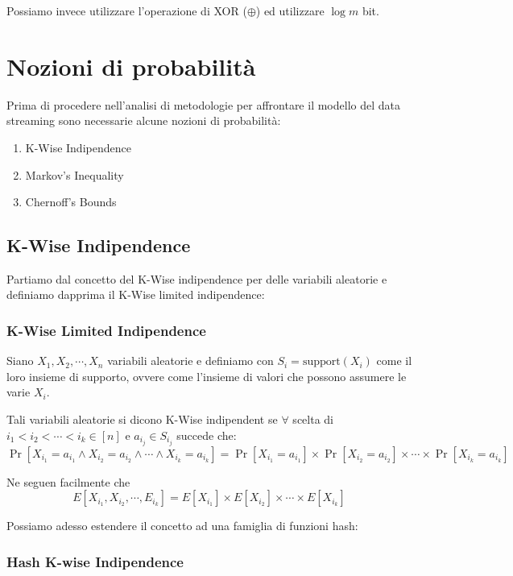 \documentclass[a4paper,11pt]{book}
\begin{document}
Possiamo invece utilizzare l'operazione di \textsf{XOR} ($\oplus$) ed utilizzare $\log m$ bit.

\section{Nozioni di probabilit\`a}

Prima di procedere nell'analisi di metodologie per affrontare il modello del data streaming sono necessarie alcune nozioni di probabilit\`a:
\begin{enumerate}
\item K-Wise Indipendence
\item Markov's Inequality
\item Chernoff's Bounds
\end{enumerate}

\subsection{K-Wise Indipendence}

Partiamo dal concetto del K-Wise indipendence per delle variabili aleatorie e definiamo dapprima il K-Wise limited indipendence:

\subsubsection{K-Wise Limited Indipendence}

Siano $X_1, X_2, \cdots, X_n$ variabili aleatorie e definiamo con $S_i = \mbox{support}(X_i)$ come il loro insieme di supporto, ovvere come l'insieme di valori che possono assumere le varie $X_i$.

Tali variabili aleatorie si dicono K-Wise indipendent se $\forall$ scelta di $i_1 < i_2 < \cdots < i_k \in [n]$ e $a_{i_j} \in S_{i_j}$ succede che:
$$\Pr[X_{i_1} = a_{i_1} \wedge X_{i_2} = a_{i_2} \wedge \cdots \wedge X_{i_k} = a_{i_k}] = \Pr[X_{i_1} = a_{i_1}] \times \Pr[X_{i_2} = a_{i_2}] \times \cdots \times \Pr[X_{i_k} = a_{i_k}] $$

Ne seguen facilmente che $$E[X_{i_1}, X_{i_2}, \cdots, E_{i_k}] = E[X_{i_1}] \times E[X_{i_2}] \times \cdots \times E[X_{i_k}] $$

Possiamo adesso estendere il concetto ad una famiglia di funzioni hash:

\subsubsection{Hash K-wise Indipendence}
\end{document}
